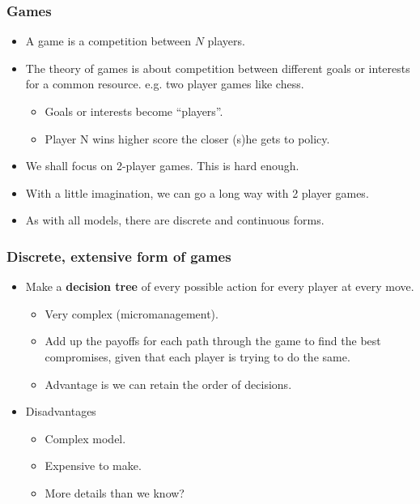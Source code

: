 \documentclass{beamer}
\begin{document}

\begin{frame}\frametitle{Games}

\begin{itemize}
\item A game is a competition between $N$ players.\vspace{0.2cm}

\item The theory of games is about competition between different goals or interests
for a common resource. e.g. two player games like chess.\vspace{0.2cm}

\begin{itemize}
\item Goals or interests become ``players''.
\item Player N wins higher score the closer (s)he gets to policy.\vspace{0.2cm}
\end{itemize}
\item We shall focus on 2-player games. This is hard enough.\vspace{0.2cm}

\item With a little imagination, we can go a long way with 2 player games.\vspace{0.2cm}

\item As with all models, there are discrete and continuous forms.
\end{itemize}
\end{frame}


\begin{frame}\frametitle{Discrete, extensive form of games}

\begin{itemize}
\item Make a {\bf decision tree} of every possible action for every player at every move.

\begin{itemize}
\item Very complex (micromanagement).

\item Add up the payoffs for each path through the game to find the best compromises,
given that each player is trying to do the same.
\item Advantage is we can retain the order of decisions.
\end{itemize}

\item Disadvantages
\begin{itemize}
\item Complex model. 
\item Expensive to make. 
\item More details than we know?\vspace{0.2cm}
\end{itemize}
\end{itemize}
\end{frame}
\end{document}
